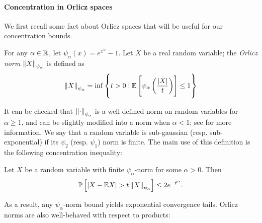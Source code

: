 \paragraph{Concentration in Orlicz spaces} We first recall some fact about Orlicz spaces that will be useful for our concentration bounds.
 \begin{definition}
     For any $\alpha \in \mathbb{R}$, let $\psi_\alpha(x) = e^{x^\alpha} - 1$. Let $X$ be a real random variable; the \emph{Orlicz norm} $\left\lVert X\right\rVert_{\psi_\alpha}$ is defined as
     \begin{equation}
         \left\lVert X\right\rVert_{\psi_\alpha} = \inf \left\{t > 0 :  \mathbb{E}\left[ \psi_\alpha\left(\frac{|X|}{t} \right)\right] \leq 1\right\}
     \end{equation}
 \end{definition}
 It can be checked that $\left\lVert \cdot\right\rVert_{\psi_\alpha}$ is a well-defined norm on random variables for $\alpha \geq  1$, and can be slightly modified into a norm when $\alpha < 1$; see \cite{ledoux1991probability,vandervaart1996weak} for more information. We say that a random variable is sub-gaussian (resp. sub-exponential) if its $\psi_2$ (resp. $\psi_1$) norm is finite. The main use of this definition is the following concentration inequality:
 \begin{lemma}\label{2406:lem:app:orlicz_concentration}
    Let $X$ be a random variable with finite $\psi_\alpha$-norm for some $\alpha > 0$. Then
      \begin{equation}
     \mathbb{P}\left[\left| X - \mathbb{E} X \right| > t\left\lVert X\right\rVert_{\psi_\alpha}\right] \leq 2e^{-t^\alpha}.
    \end{equation}
 \end{lemma}
As a result, any $\psi_\alpha$-norm bound yields exponential convergence tails. Orlicz norms are also well-behaved with respect to products:
 
